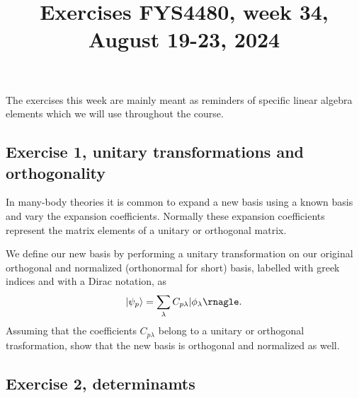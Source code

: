 \documentclass[prc]{revtex4}
\begin{document}
\title{Exercises FYS4480, week 34, August 19-23, 2024}
\maketitle
The exercises this week are mainly meant as reminders of specific linear algebra elements which we will use throughout the course.

\subsection*{Exercise 1, unitary transformations and orthogonality}

In many-body theories 
it is common to  expand a new basis using a known basis  and vary the expansion coefficients. Normally these expansion coefficients represent the matrix elements of a unitary or orthogonal matrix.

We define our new basis by performing a unitary transformation 
on our original orthogonal and normalized (orthonormal for short) basis, labelled with greek indices and with a Dirac notation, as
\[
\vert \psi_p\rangle  = \sum_{\lambda} C_{p\lambda}\vert \phi_{\lambda}\rnagle. 
\]
Assuming that the  coefficients $C_{p\lambda}$ belong to a unitary or orthogonal trasformation, 
show that the new basis is orthogonal and normalized as well.


\subsection*{Exercise 2, determinamts}
\end{document}
